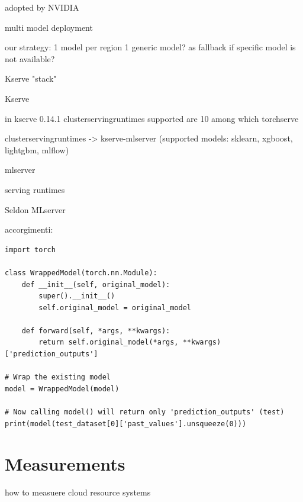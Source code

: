 adopted by NVIDIA



multi model deployment



our strategy:
1 model per region
1 generic model? as fallback if specific model is not available?




Kserve "stack"

Kserve

in kserve 0.14.1
clusterservingruntimes
supported are 10
among which 
torchserve

clusterservingruntimes -> kserve-mlserver (supported models: sklearn, xgboost, lightgbm, mlflow)

mlserver









serving runtimes

Seldon MLserver


accorgimenti: \\

\lstset{style=python}
\begin{lstlisting}[caption={Wrapping a PyTorch Model}, label={lst:wrapped_model}]
import torch

class WrappedModel(torch.nn.Module):
    def __init__(self, original_model):
        super().__init__()
        self.original_model = original_model

    def forward(self, *args, **kwargs):
        return self.original_model(*args, **kwargs)['prediction_outputs']

# Wrap the existing model
model = WrappedModel(model)

# Now calling model() will return only 'prediction_outputs' (test)
print(model(test_dataset[0]['past_values'].unsqueeze(0)))
\end{lstlisting}









\section{Measurements}


how to measuere cloud resource systems





